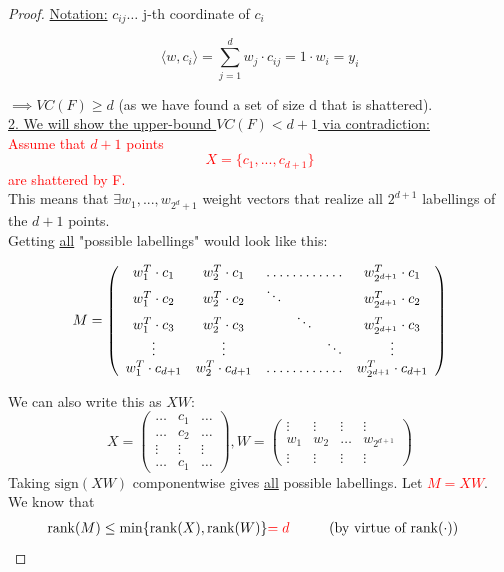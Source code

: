 \documentclass[10pt,a4paper]{article}
\theoremstyle{remark}
\theoremstyle{definition}
\theoremstyle{plain}
\begin{document}
\begin{proof}
	\underline{Notation:} $c_{ij} \hdots $ j-th coordinate of $c_i$
	
	$$
		\langle w, c_i \rangle = \sum_{j=1}^{d} w_j \cdot c_{ij} = 1 \cdot w_i = y_i 
	$$
	
	$\implies VC(F) \geq d$ (as we have found a set of size d that is shattered).\\
	

\underline{2. We will show the upper-bound $VC(F) < d+1$ via contradiction:}\\
\newline
\textcolor{red}{Assume that $d+1$ points $$X = \{ c_1, ..., c_{d+1} \}$$ are shattered by F.}\\
			
	This means that $\exists w_1, ..., w_{2^d+1}$ weight vectors that realize all $2^{d+1}$ labellings of the $d+1$ points. \\
	Getting \underline{all} "possible labellings" would look like this:

	$$
	M = \left(
	\begin{array}{cccccc}
		w_1^T \cdot c_1 & w_2^T \cdot c_1 	& \hdotsfor{3}						& w_{2^{d+1}}^T \cdot c_{1} \\
		w_1^T \cdot c_2 & w_2^T \cdot c_2 	& \ddots	& 			&			& w_{2^{d+1}}^T \cdot c_{2} \\
		w_1^T \cdot c_3 & w_2^T \cdot c_3 	&  			& \ddots	& 			& w_{2^{d+1}}^T \cdot c_{3} \\
		\vdots 			& \vdots 			&   		&  			& \ddots	& \vdots	\\
		w_1^T \cdot c_{d+1} & w_2^T \cdot c_{d+1} & \hdotsfor{3} 				& w_{2^{d+1}}^T \cdot c_{d+1}
	\end{array}\right)
	$$
	
	We can also write this as $XW$:
	$$
		X = \left(\begin{array}{ccc}
			\hdots & c_1 & \hdots \\
			 \hdots & c_2 & \hdots\\
			 \vdots & \vdots & \vdots \\
			\hdots & c_1 & \hdots
		\end{array}\right), 
		W = \left(\begin{array}{cccc}
			\vdots & \vdots & \vdots & \vdots \\
			w_1 & w_2 & \hdots & w_{2^{d+1}}\\
			\vdots & \vdots & \vdots & \vdots
		\end{array}\right)
	$$
	Taking $\text{sign}(XW)$ componentwise gives \underline{all} possible labellings. Let \textcolor{red}{$M = XW$}.\\
	We know that 
	\begin{align*}
		\text{rank}(M) \leq \min\{ \text{rank}(X), \text{rank}(W) \} \text{\textcolor{red}{$= d$}} & \hspace{1cm} \text{(by virtue of rank$(\cdot)$)}
	\end{align*}
	

\end{proof}
\end{document}
